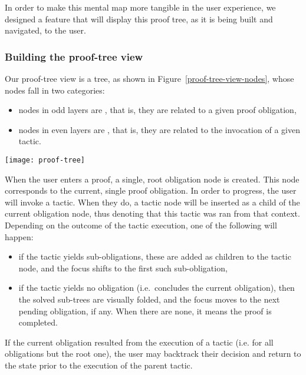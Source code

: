 In order to make this mental map more tangible in the user experience, we
designed a feature that will display this proof tree, as it is being built and
navigated, to the user.

\subsubsection{Building the proof-tree view}

Our proof-tree view is a tree, as shown in Figure~\ref{proof-tree-view-nodes},
whose nodes fall in two categories:

\begin{itemize}

  \item nodes in odd layers are , that is, they are related to a given proof obligation,

  \item nodes in even layers are , that is, they are related to the invocation of a given tactic.

\end{itemize}

\begin{figure*}[!htp]
\texttt{[image: proof-tree]}{\parfillskip=0pt\par}
\caption{Proof-tree view: three obligations nodes and one tactic node}%
\label{proof-tree-view-nodes}
\end{figure*}

When the user enters a proof, a single, root obligation node is created.  This
node corresponds to the current, single proof obligation.  In order to progress,
the user will invoke a tactic.  When they do, a tactic node will be inserted as
a child of the current obligation node, thus denoting that this tactic was ran
from that context.  Depending on the outcome of the tactic execution, one of the
following will happen:

\begin{itemize}

  \item if the tactic yields sub-obligations, these are added as children to the
tactic node, and the focus shifts to the first such sub-obligation,

  \item if the tactic yields no obligation (i.e.\ concludes the current
obligation), then the solved sub-trees are visually folded, and the focus moves
to the next pending obligation, if any.  When there are none, it means the proof
is completed.

\end{itemize}

If the current obligation resulted from the execution of a tactic (i.e. for all
obligations but the root one), the user may backtrack their decision and return
to the state prior to the execution of the parent tactic.
